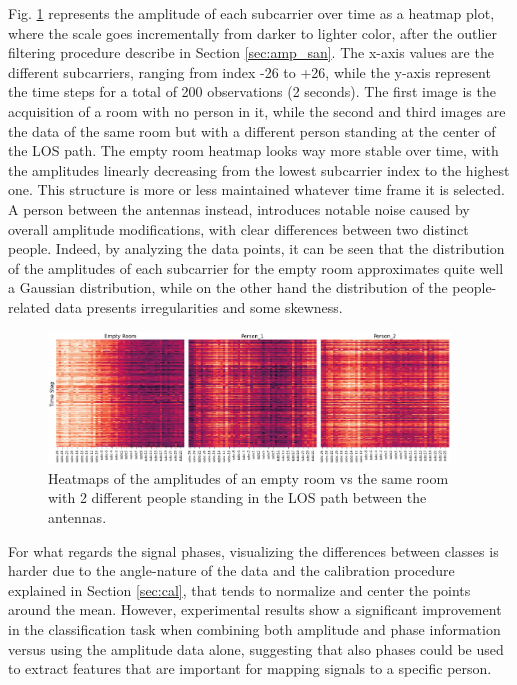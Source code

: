 \documentclass[binding=0.7cm, oneside]{sapthesis}
\begin{document}
Fig. \ref{fig:heatmap} represents the amplitude of each subcarrier over time as a heatmap plot, where the scale goes incrementally from darker to lighter color, after the outlier filtering procedure describe in Section \ref{sec:amp_san}. The x-axis values are the different subcarriers,
ranging from index -26 to +26, while the y-axis represent the time steps for a total of 200 observations (2 seconds). The first image is the acquisition of a room with no person in it, while the second and third
images are the data of the same room but with a different person standing at the center of the LOS path. The empty room heatmap looks way more stable over time, with the amplitudes linearly decreasing
from the lowest subcarrier index to the highest one. This structure is more or less maintained whatever time frame it is selected. A person between the antennas instead, introduces notable noise caused by overall amplitude modifications,
with clear differences between two distinct people. Indeed, by analyzing the data points, it can be seen that the distribution of the amplitudes of each subcarrier for the empty room approximates quite well a Gaussian distribution, while on the other hand the distribution of the people-related data presents
irregularities and some skewness.
\begin{figure}[h]
    \centering
    \includegraphics[width=0.95\textwidth]{images/heatmap_3.png}
    \caption{Heatmaps of the amplitudes of an empty room vs the same room with 2 different people standing in the LOS path between the antennas.}
    \label{fig:heatmap}
\end{figure}
For what regards the signal phases, visualizing the differences between classes is harder due to the angle-nature of the data and the calibration procedure explained in Section \ref{sec:cal}, that tends to normalize and center the points around the mean.
However, experimental results show a significant improvement in the classification task when combining both amplitude and phase information versus using the amplitude data alone, suggesting that also phases could be used to extract features that are
important for mapping signals to a specific person.
\end{document}
